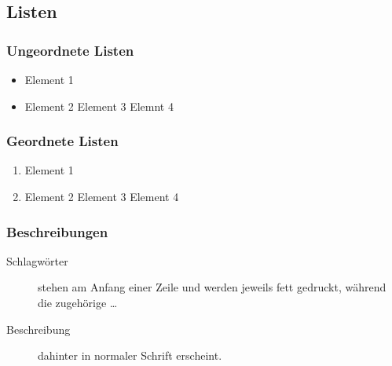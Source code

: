 \subsection{Listen}
\label{sec:Listen}

\subsubsection{Ungeordnete Listen}
\label{sec:UngeordneteListen}

\begin{itemize}
	\item Element 1
	\item Element 2
	\subitem Element 3
	\subsubitem Elemnt 4
\end{itemize}

\subsubsection{Geordnete Listen}
\label{sec:GeordneteListen}

\begin{enumerate}
	\item Element 1
	\item Element 2
	\subitem Element 3
	\subsubitem Element 4
\end{enumerate}

\subsubsection{Beschreibungen}
\label{sec:Beschreibungen}

\begin{description}
	\item[Schlagwörter] stehen am Anfang einer Zeile und werden jeweils fett gedruckt, während die zugehörige \dots
	\item[Beschreibung] dahinter in normaler Schrift erscheint.
\end{description}


